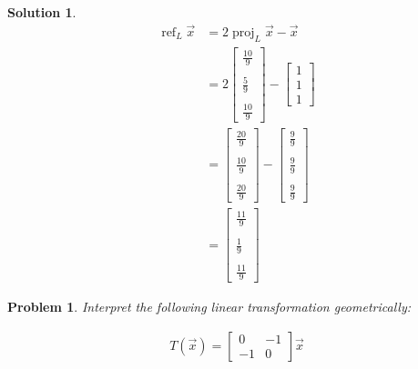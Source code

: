 \documentclass{article}
\newtheorem{problem}{Problem}
\newtheorem*{solution}{Solution}
\DeclareMathOperator{\proj}{proj}
\DeclareMathOperator{\refl}{ref}
\newcommand{\vectorproj}[2][]{\proj_{#1}#2}
\newcommand{\vectorrefl}[2][]{\refl_{#1}#2}
\begin{document}
\begin{solution}
\begin{align*}
\vectorrefl[L]{\vec{x}} &= 2 \vectorproj[L]{\vec{x}} - \vec{x} \\
&= 2 \begin{bmatrix} \frac{10}{9} \\ \\  \frac{5}{9} \\ \\ \frac{10}{9} \end{bmatrix} - \begin{bmatrix} 1 \\ 1 \\ 1 \end{bmatrix} \\
&= \begin{bmatrix} \frac{20}{9} \\ \\  \frac{10}{9} \\ \\ \frac{20}{9} \end{bmatrix} - \begin{bmatrix} \frac{9}{9} \\ \\ \frac{9}{9} \\ \\ \frac{9}{9} \end{bmatrix} \\
&= \begin{bmatrix} \frac{11}{9} \\ \\  \frac{1}{9} \\ \\ \frac{11}{9} \end{bmatrix}
\end{align*}
\end{solution}

\begin{problem}
Interpret the following linear transformation geometrically:

\begin{align*}
T(\vec{x}) =
\begin{bmatrix}
0 & -1 \\
-1 & 0
\end{bmatrix} \vec{x}
\end{align*}
\end{problem}
\end{document}
